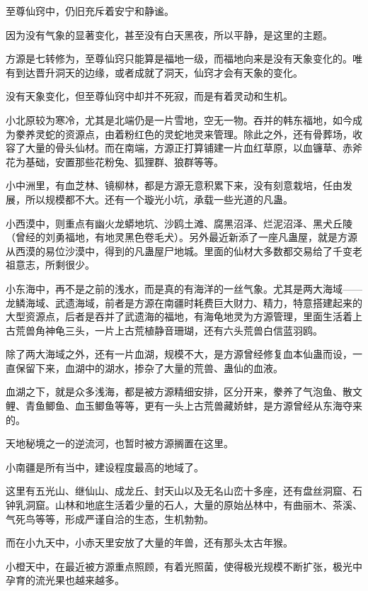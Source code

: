 
\begin{this_body}

至尊仙窍中，仍旧充斥着安宁和静谧。

因为没有气象的显著变化，甚至没有白天黑夜，所以平静，是这里的主题。

方源是七转修为，至尊仙窍只能算是福地一级，而福地向来是没有天象变化的。唯有到达晋升洞天的边缘，或者成就了洞天，仙窍才会有天象的变化。

没有天象变化，但至尊仙窍中却并不死寂，而是有着灵动和生机。

小北原较为寒冷，尤其是北端仍是一片雪地，空无一物。吞并的韩东福地，如今成为豢养灵蛇的资源点，由着粉红色的灵蛇地灵来管理。除此之外，还有骨葬场，收容了大量的骨头仙材。而在南端，方源正打算铺建一片血红草原，以血镰草、赤斧花为基础，安置那些花粉兔、狐狸群、狼群等等。

小中洲里，有血芝林、镜柳林，都是方源无意积累下来，没有刻意栽培，任由发展，所以规模都不大。还有一个璇光小坑，承载一些光道的凡蛊。

小西漠中，则重点有幽火龙蟒地坑、沙鸥土滩、腐黑沼泽、烂泥沼泽、黑犬丘陵（曾经的刘勇福地，有地灵黑色卷毛犬）。另外最近新添了一座凡蛊屋，就是方源从西漠的易位沙漠中，得到的凡蛊屋尸地城。里面的仙材大多数都交易给了千变老祖意志，所剩很少。

小东海中，再不是之前的浅水，而是真的有海洋的一丝气象。尤其是两大海域——龙鳞海域、武遗海域，前者是方源在南疆时耗费巨大财力、精力，特意搭建起来的大型资源点，后者是吞并了武遗海的福地，有海龟地灵为方源管理，里面生活着上古荒兽角神龟三头，一片上古荒植静音珊瑚，还有六头荒兽白信蓝羽鸥。

除了两大海域之外，还有一片血湖，规模不大，是方源曾经修复血本仙蛊而设，一直保留下来，血湖中的湖水，掺杂了大量的荒兽、蛊仙的血液。

血湖之下，就是众多浅海，都是被方源精细安排，区分开来，豢养了气泡鱼、散文鲤、青鱼鲫鱼、血玉鲫鱼等等，更有一头上古荒兽藏娇蚌，是方源曾经从东海夺来的。

天地秘境之一的逆流河，也暂时被方源搁置在这里。

小南疆是所有当中，建设程度最高的地域了。

这里有五光山、继仙山、成龙丘、封天山以及无名山峦十多座，还有盘丝洞窟、石钟乳洞窟。山林和地底生活着少量的石人，大量的原始丛林中，有曲丽木、茶溪、气死鸟等等，形成严谨自洽的生态，生机勃勃。

而在小九天中，小赤天里安放了大量的年兽，还有那头太古年猴。

小橙天中，在最近被方源重点照顾，有着光照菌，使得极光规模不断扩张，极光中孕育的流光果也越来越多。


\end{this_body}
